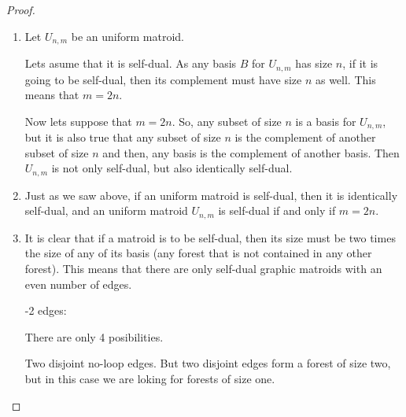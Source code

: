 \begin{proof}$\,$\pn
    \begin{enumerate}[label=(\roman*)]
        \item 
            Let $U_{n,m}$ be an uniform matroid.\pn
            
            Lets asume that it is self-dual. As
            any basis $B$ for $U_{n,m}$ has size $n$, if it is going to be self-dual,
            then its complement must have size $n$ as well. This means that $m = 2n$.\pn
            
            Now lets suppose that $m = 2n$. So, any subset of size $n$ is a basis for $U_{n,m}$,
            but it is also true that any subset of size $n$ is the complement of another subset
            of size $n$ and then, any basis is the complement of another basis. Then $U_{n,m}$ is
            not only self-dual, but also identically self-dual.
        \item 
            Just as we saw above, if an uniform matroid is self-dual, then it is identically self-dual, and
            an uniform matroid $U_{n,m}$ is self-dual if and only if $m = 2n$.
        \item 
            It is clear that if a matroid is to be self-dual, then its size must be two times
            the size of any of its basis (any forest that is not contained in any other forest). 
            This means that there are only self-dual graphic matroids with an even number of edges. \pn
            
            -2 edges:\pn
            
            There are only 4 posibilities.\pn 
            
            Two disjoint no-loop edges. But two disjoint edges form a forest of size two, but in this case we 
            are loking for forests of size one.\pn
            

\end{enumerate}
\end{proof}
